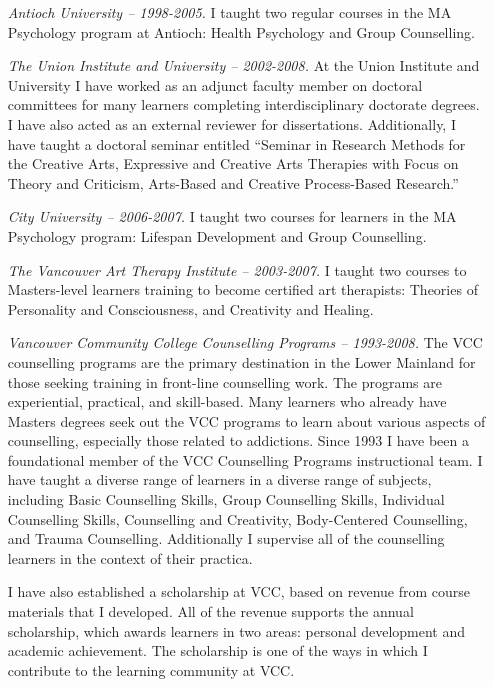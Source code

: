 \documentclass[10pt,DIV09,letterpaper,oneside,headsepline]{scrreprt}
\begin{document}
\begin{itemize}
\item [\textit{Antioch University -- 1998-2005.}]
I taught two regular courses in the MA Psychology program at Antioch: Health Psychology and Group Counselling.

\item [\textit{The Union Institute and University -- 2002-2008.}] At the Union Institute and University I have worked as an adjunct faculty member on doctoral committees for many learners completing interdisciplinary doctorate degrees. I have also acted as an external reviewer for dissertations. Additionally, I have taught a doctoral seminar entitled ``Seminar in Research Methods for the Creative Arts, Expressive and Creative Arts Therapies with Focus on Theory and Criticism, Arts-Based and Creative Process-Based Research.''

\item [\textit{City University -- 2006-2007.}] I taught two courses for learners in the MA Psychology program: Lifespan Development and Group Counselling.

\item [\textit{The Vancouver Art Therapy Institute -- 2003-2007.}] I taught two courses to Masters-level learners training to become certified art therapists: Theories of Personality and Consciousness, and Creativity and Healing.

\item [\textit{Vancouver Community College Counselling Programs -- 1993-2008.}] The VCC counselling programs are the primary destination in the Lower Mainland for those seeking training in front-line counselling work. The programs are experiential, practical, and skill-based. Many learners who already have Masters degrees seek out the VCC programs to learn about various aspects of counselling, especially those related to addictions. Since 1993 I have been a foundational member of the VCC Counselling Programs instructional team. I have taught a diverse range of learners in a diverse range of  subjects, including Basic Counselling Skills, Group Counselling Skills, Individual Counselling Skills, Counselling and Creativity, Body-Centered Counselling, and Trauma Counselling. Additionally I supervise all of the counselling learners in the context of their practica.

I have also established a scholarship at VCC, based on revenue from course materials that I developed. All of the revenue supports the annual scholarship, which awards learners in two areas: personal development and academic achievement. The scholarship is one of the ways in which I contribute to the learning community at VCC.


\end{itemize}
\end{document}
